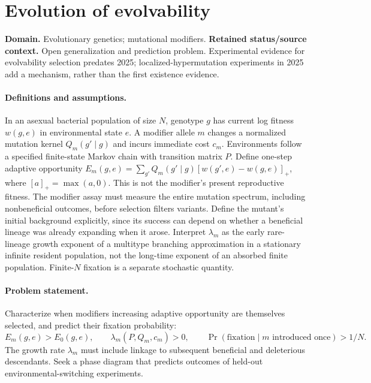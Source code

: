 \documentclass[11pt]{article}
\begin{document}
\section*{Evolution of evolvability}
\label{prob:156}
\label{rank:90}
\par\smallskip

\noindent\textbf{Domain.} Evolutionary genetics; mutational modifiers. \quad \textbf{Retained status/source context.} Open generalization and prediction problem. Experimental evidence for evolvability selection predates 2025; localized-hypermutation experiments in 2025 add a mechanism, rather than the first existence evidence.
\paragraph{Definitions and assumptions.} In an asexual bacterial population of size $N$, genotype $g$ has current log fitness $w(g,e)$ in environmental state $e$. A modifier allele $m$ changes a normalized mutation kernel $Q_m(g'\mid g)$ and incurs immediate cost $c_m$. Environments follow a specified finite-state Markov chain with transition matrix $P$. Define one-step adaptive opportunity $E_m(g,e)=\sum_{g'}Q_m(g'\mid g)[w(g',e)-w(g,e)]_+$, where $[a]_+=\max(a,0)$. This is not the modifier's present reproductive fitness. The modifier assay must measure the entire mutation spectrum, including nonbeneficial outcomes, before selection filters variants. Define the mutant's initial background explicitly, since its success can depend on whether a beneficial lineage was already expanding when it arose. Interpret $\lambda_m$ as the early rare-lineage growth exponent of a multitype branching approximation in a stationary infinite resident population, not the long-time exponent of an absorbed finite population. Finite-$N$ fixation is a separate stochastic quantity.
\paragraph{Problem statement.} Characterize when modifiers increasing adaptive opportunity are themselves selected, and predict their fixation probability:
\[
 E_m(g,e)>E_0(g,e),\qquad
 \lambda_m(P,Q_m,c_m)>0,
 \qquad \Pr(\mathrm{fixation}\mid m\text{ introduced once})>1/N.
\]
The growth rate $\lambda_m$ must include linkage to subsequent beneficial and deleterious descendants. Seek a phase diagram that predicts outcomes of held-out environmental-switching experiments.
\end{document}

